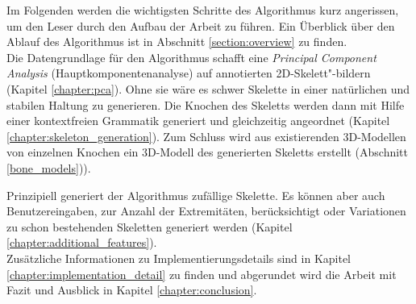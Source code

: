 Im Folgenden werden die wichtigsten Schritte des Algorithmus kurz angerissen, um den Leser durch den Aufbau der Arbeit zu führen. Ein Überblick über den Ablauf des Algorithmus ist in Abschnitt \ref{section:overview} zu finden.\\
Die Datengrundlage für den Algorithmus schafft eine \emph{Principal Component Analysis} (Hauptkomponentenanalyse) auf annotierten 2D-Skelett"-bildern (Kapitel \ref{chapter:pca}). Ohne sie wäre es schwer Skelette in einer natürlichen und stabilen Haltung zu generieren.
Die Knochen des Skeletts werden dann mit Hilfe einer kontextfreien Grammatik generiert und gleichzeitig angeordnet (Kapitel \ref{chapter:skeleton_generation}). 
Zum Schluss wird aus existierenden 3D-Modellen von einzelnen Knochen ein 3D-Modell des generierten Skeletts erstellt (Abschnitt \ref{bone_models})).

Prinzipiell generiert der Algorithmus zufällige Skelette. Es können aber auch Benutzereingaben, \zb zur Anzahl der Extremitäten, berücksichtigt oder Variationen zu schon bestehenden Skeletten generiert werden (Kapitel \ref{chapter:additional_features}). \\
Zusätzliche Informationen zu Implementierungsdetails sind in Kapitel \ref{chapter:implementation_detail} zu finden und abgerundet wird die Arbeit mit Fazit und Ausblick in Kapitel \ref{chapter:conclusion}.



